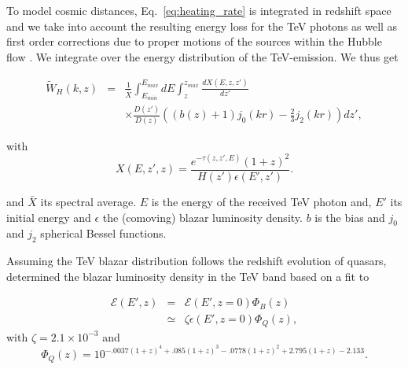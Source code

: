 \documentclass[twocolumns]{emulateapj}
\newcommand\Pc[1]{{\color{cyan} \bf #1}} %
\begin{document}
{ To model cosmic distances, Eq.~\ref{eq:heating_rate} is integrated in redshift space and we take into account the resulting energy loss for the TeV photons as well as first order corrections due to proper motions of the sources within the Hubble flow \citep{1987MNRAS.227....1K}. We integrate over the energy distribution of the TeV-emission. We thus get

\begin{eqnarray}
  \label{eq:window}
  \tilde{W}_H(k,z)&=&\frac{1}{\bar{X}}\int_{E_{min}}^{E_{max}}dE\int_z^{z_{max}}\frac{dX(E,z,z')}{dz'} \\ 
&&\times \frac{D(z')}{D(z)}\left((b(z)+1)j_0(kr)-\frac{2}{3}j_2(kr)\right)dz', \nonumber
\end{eqnarray}

with 
 \begin{equation}
  \label{eq:define_X}
  X(E,z',z)=\frac{e^{-\tau(z,z',E)}(1+z)^2}{H(z')\epsilon(E',z')}.
\end{equation}

and $\bar{X}$ its spectral average. $E$ is the energy of the received TeV photon and, $E'$ its initial energy and  $\epsilon$ the (comoving) blazar luminosity density. $b$ is the bias and $j_0$ and $j_2$ spherical Bessel functions.


Assuming the TeV blazar distribution follows the redshift evolution of quasars, \citet{2012ApJ...752...22B} determined the blazar luminosity density in the TeV band based on a fit to \citet{2007ApJ...654..731H}

\begin{eqnarray}
  \label{eq:mean_heat}
  \mathcal{E}(E',z)&=&\mathcal{E}(E',z=0)\Phi_{B}(z)\\ \nonumber
&\simeq& \zeta\epsilon(E',z=0)\Phi_{Q}(z),
\end{eqnarray}
with $\zeta=2.1\times 10^{-3}$ and
\begin{equation}
  \label{eq:phi_quasar}
 \Phi_{Q}(z)=10^{-.0037(1+z)^4+.085(1+z)^3-.0778(1+z)^2+2.795(1+z)-2.133}. 
\end{equation}
 

}
\end{document}
